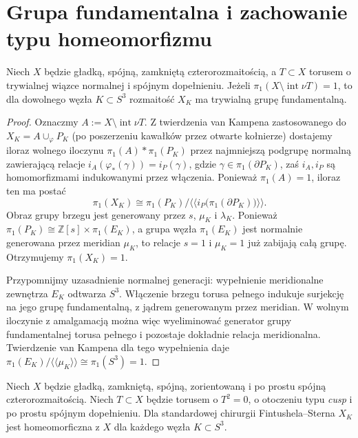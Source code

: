 \section{Grupa fundamentalna i zachowanie typu homeomorfizmu}
\label{sec:tg-ks-pi1}

\begin{twierdzenie}
\label{thm:tg-ks-pi1}
Niech $X$ będzie gładką, spójną, zamkniętą
czterorozmaitością, a $T\subset X$ torusem o
trywialnej wiązce normalnej i spójnym dopełnieniu.
Jeżeli $\pi_1(X\setminus\operatorname{int}\nu T)=1$,
to dla dowolnego węzła $K\subset S^3$
rozmaitość $X_K$ ma trywialną grupę fundamentalną.
\end{twierdzenie}

\begin{proof}
Oznaczmy $A:=X\setminus\operatorname{int}\nu T$.
Z twierdzenia van Kampena zastosowanego do
$X_K=A\cup_\varphi P_K$ (po poszerzeniu kawałków
przez otwarte kołnierze) dostajemy iloraz wolnego
iloczynu $\pi_1(A)*\pi_1(P_K)$ przez najmniejszą podgrupę normalną zawierającą relacje
$i_A(\varphi_*(\gamma))=i_P(\gamma)$,
gdzie $\gamma\in\pi_1(\partial P_K)$, zaś $i_A,i_P$
są homomorfizmami indukowanymi przez włączenia.
Ponieważ $\pi_1(A)=1$, iloraz ten ma postać
\[
\pi_1(X_K)\cong
\pi_1(P_K)\big/\langle\!\langle
  i_P\bigl(\pi_1(\partial P_K)\bigr)
\rangle\!\rangle.
\]
Obraz grupy brzegu jest generowany przez $s$, $\mu_K$
i $\lambda_K$. Ponieważ
$\pi_1(P_K)\cong\mathbb Z[s]\times\pi_1(E_K)$,
a grupa węzła $\pi_1(E_K)$ jest normalnie generowana
przez meridian $\mu_K$, to relacje $s=1$ i
$\mu_K=1$ już zabijają całą grupę. Otrzymujemy
$\pi_1(X_K)=1$.

Przypomnijmy uzasadnienie normalnej generacji:
wypełnienie meridionalne zewnętrza $E_K$
odtwarza $S^3$. Włączenie brzegu torusa pełnego
indukuje surjekcję na jego grupę fundamentalną,
z jądrem generowanym przez meridian.
W wolnym iloczynie z amalgamacją można więc
wyeliminować generator grupy fundamentalnej torusa
pełnego i pozostaje dokładnie relacja meridionalna.
Twierdzenie van Kampena dla tego wypełnienia daje
$\pi_1(E_K)/\langle\!\langle\mu_K\rangle\!\rangle
\cong\pi_1(S^3)=1$.
\end{proof}

\begin{twierdzenie}
\label{thm:tg-ks-homeo}
Niech $X$ będzie gładką, zamkniętą, spójną,
zorientowaną i po prostu spójną czterorozmaitością.
Niech $T\subset X$ będzie torusem o $T^2=0$,
o otoczeniu typu \emph{cusp} i po prostu spójnym
dopełnieniu. Dla standardowej chirurgii
Fintushela--Sterna $X_K$ jest homeomorficzna z $X$
dla każdego węzła $K\subset S^3$.
\end{twierdzenie}

